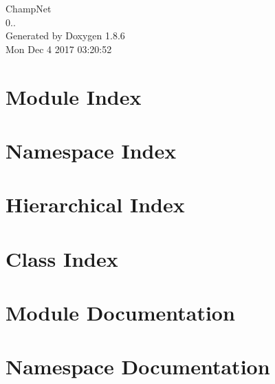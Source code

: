 \documentclass[twoside]{book}
\newcommand{\clearemptydoublepage}{%
  \newpage{\pagestyle{empty}\cleardoublepage}%
}
\begin{document}
\hypersetup{pageanchor=false}
\begin{titlepage}
\vspace*{7cm}
\begin{center}%
{\Large Champ\-Net \\[1ex]\large 0.. }\\
\vspace*{1cm}
{\large Generated by Doxygen 1.8.6}\\
\vspace*{0.5cm}
{\small Mon Dec 4 2017 03:20:52}\\
\end{center}
\end{titlepage}
\clearemptydoublepage
\tableofcontents
\clearemptydoublepage
{}
\hypersetup{pageanchor=true}

\chapter{Module Index}

\chapter{Namespace Index}

\chapter{Hierarchical Index}

\chapter{Class Index}

\chapter{Module Documentation}

\chapter{Namespace Documentation}


\end{document}
